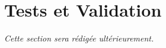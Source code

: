 \chapter{Tests et Validation}
\label{chap:tests}
\textit{Cette section sera rédigée ultérieurement.}
